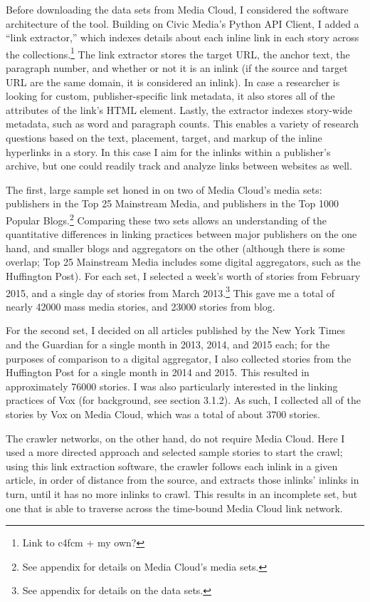 Before downloading the data sets from Media Cloud, I considered the software architecture of the tool. Building on Civic Media's Python API Client, I added a ``link extractor,'' which indexes details about each inline link in each story across the collections.\footnote{Link to c4fcm + my own?} The link extractor stores the target URL, the anchor text, the paragraph number, and whether or not it is an inlink (if the source and target URL are the same domain, it is considered an inlink). In case a researcher is looking for custom, publisher-specific link metadata, it also stores all of the attributes of the link's HTML element. Lastly, the extractor indexes story-wide metadata, such as word and paragraph counts. This enables a variety of research questions based on the text, placement, target, and markup of the inline hyperlinks in a story. In this case I aim for the inlinks within a publisher's archive, but one could readily track and analyze links between websites as well.

The first, large sample set honed in on two of Media Cloud's media sets: publishers in the Top 25 Mainstream Media, and publishers in the Top 1000 Popular Blogs.\footnote{See appendix for details on Media Cloud's media sets.} Comparing these two sets allows an understanding of the quantitative differences in linking practices between major publishers on the one hand, and smaller blogs and aggregators on the other (although there is some overlap; Top 25 Mainstream Media includes some digital aggregators, such as the Huffington Post). For each set, I selected a week's worth of stories from February 2015, and a single day of stories from March 2013.\footnote{See appendix for details on the data sets.} This gave me a total of nearly 42000 mass media stories, and 23000 stories from blog.

For the second set, I decided on all articles published by the New York Times and the Guardian for a single month in 2013, 2014, and 2015 each; for the purposes of comparison to a digital aggregator, I also collected stories from the Huffington Post for a single month in 2014 and 2015. This resulted in approximately 76000 stories. I was also particularly interested in the linking practices of Vox (for background, see section 3.1.2). As such, I collected all of the stories by Vox on Media Cloud, which was a total of about 3700 stories.

The crawler networks, on the other hand, do not require Media Cloud. Here I used a more directed approach and selected sample stories to start the crawl; using this link extraction software, the crawler follows each inlink in a given article, in order of distance from the source, and extracts those inlinks' inlinks in turn, until it has no more inlinks to crawl. This results in an incomplete set, but one that is able to traverse across the time-bound Media Cloud link network.

